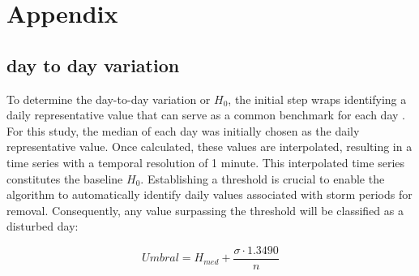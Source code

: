 \documentclass[12pt]{article}
\begin{document}
\section{Appendix}
\label{S.4}


\subsection{day to day variation}
\label{S.4.1}

To determine the day-to-day variation or $H_0$, the initial step wraps identifying a daily representative value that can serve as a common benchmark for each day \citep{baseline_Gjerloev}. For this study, the median of each day was initially chosen as the daily representative value. Once calculated, these values are interpolated, resulting in a time series with a temporal resolution of 1 minute. This interpolated time series constitutes the baseline $H_0$. Establishing a threshold is crucial to enable the algorithm to automatically identify daily values associated with storm periods for removal. Consequently, any value surpassing the threshold will be classified as a disturbed day:

\begin{equation}
	\label{eq:2.1}
	Umbral = H_{med} + \frac{\sigma \cdot 1.3490}{n}
\end{equation}
\end{document}
